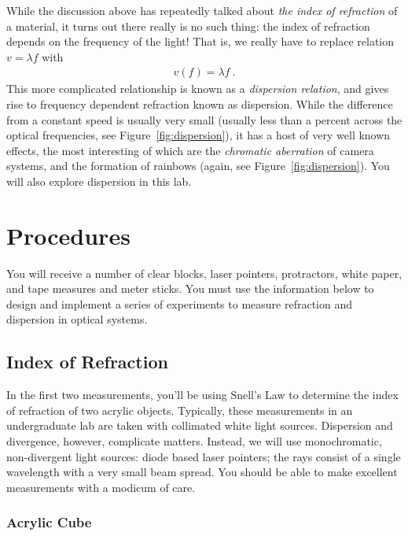 \documentclass[12pt]{article}
\begin{document}
While the discussion above has repeatedly talked about \textit{the
  index of refraction} of a material, it turns out there really is no
such thing: the index of refraction depends on the frequency of the
light!  That is, we really have to replace relation $v = \lambda f$
with
\begin{gather*}
  v(f) = \lambda f\ .
\end{gather*}
This more complicated relationship is known as a \textit{dispersion
  relation}, and gives rise to frequency dependent refraction known as
dispersion.  While the difference from a constant speed is usually
very small (usually less than a percent across the optical
frequencies, see Figure~\ref{fig:dispersion}), it has a host of very
well known effects, the most interesting of which are the
\textit{chromatic aberration} of camera systems, and the formation of
rainbows (again, see Figure~\ref{fig:dispersion}).  You will also
explore dispersion in this lab.

\section{Procedures}
\label{sec:procedures}

You will receive a number of clear blocks, laser pointers,
protractors, white paper, and tape measures and meter sticks.  You
must use the information below to design and implement a series of
experiments to measure refraction and dispersion in optical systems. 

\subsection{Index of Refraction}
\label{sec:index}

In the first two measurements, you'll be using Snell's Law to
determine the index of refraction of two acrylic objects.  Typically,
these measurements in an undergraduate lab are taken with collimated
white light sources.  Dispersion and divergence, however, complicate
matters.  Instead, we will use monochromatic, non-divergent light
sources: diode based laser pointers; the rays consist of a single
wavelength with a very small beam spread.  You should be able to make
excellent measurements with a modicum of care.

\subsubsection{Acrylic Cube}
\label{sec:cube}
\end{document}
